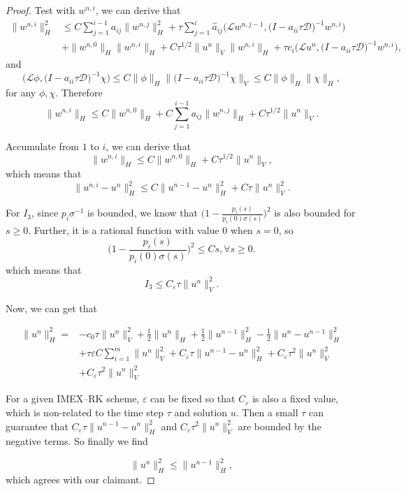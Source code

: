 \documentclass[a4paper, oneside]{book}
\def\epsilon{\varepsilon}
\def\hata{{\hat{a}}}
\def\calD{{\mathcal{D}}}
\def\calL{{\mathcal{L}}}
\begin{document}
\begin{proof}
Test with $w^{n,i}$, we can derive that 
\begin{align*}\|w^{n,i}\|_H^2 &\leq C \sum\limits_{j=1}^{i-1}a_{ij}\|w^{n,j}\|_H^2 
+ \tau \sum\limits_{j=1}^i\hata_{ij}\big(\calL w^{n,j-1},\big(I-a_{ii}\tau \calD \big)^{-1} w^{n,i} \big)\\
&+ \|w^{n,0}\|_H\|w^{n,i}\|_H + C\tau^{1/2} \|u^n\|_V\|w^{n,i}\|_H+ \tau c_i\big(\calL u^n, \big(I-a_{ii}\tau \calD\big)^{-1}w^{n,i}\big),
\end{align*}
and
$$\big(\calL\phi,\big(I-a_{ii}\tau \calD\big)^{-1} \chi \big) 
\leq C\|\phi\|_H\|\big(I-a_{ii}\tau \calD\big)^{-1} \chi\|_V
\leq C\|\phi\|_H\|\chi\|_H,$$
for any $\phi, \chi$. 
Therefore
$$\|w^{n,i}\|_H \leq C \|w^{n,0}\|_H + C \sum\limits_{j=1}^{i-1}a_{ij}\|w^{n,j}\|_H+C \tau^{1/2}\|u^n\|_V.$$

Accumulate from $1$ to $i$, we can derive that
$$\|w^{n,i}\|_H \leq C \|w^{n,0}\|_H + C \tau^{1/2}\|u^n\|_V,$$
which means that
$$\|u^{n,i}-u^n\|_H^2 \leq C \|u^{n-1}-u^n\|_H^2 + C \tau\|u^n\|_V^2.$$

For $I_3$, since $p_i\sigma^{-1}$ is bounded, we know that $\Big(1 -\frac{p_i(s)}{p_i(0)\sigma(s)}\Big)^2$
is also bounded for $s\geq 0$. Further, it is a rational function with value $0$ when $s = 0$, so
$$\bigg(1 -\frac{p_i(s)}{p_i(0)\sigma(s)}\bigg)^2 \leq Cs, \forall s \geq 0.$$
which means that
$$I_3 \leq C_\epsilon\tau \big\|u^n\big\|_V^2.$$

Now, we can get that

\begin{align*}
    \big\|u^n\big\|_H^2 =& - c_0\tau\big\|u^n\big\|_V^2 + \frac12\big\|u^n\big\|_H+\frac12\big\|u^{n-1}\big\|_H^2-\frac12\big\|u^n-u^{n-1}\big\|_H^2\\
    &+ \tau \epsilon C \sum_{i=1}^m\big\|u^n\big\|_V^2 + C_\epsilon\tau \|u^{n-1}-u^n\|_H^2 + C_\epsilon \tau^2\|u^n\|_V^2 \\
    &+ C_\epsilon\tau^2 \big\|u^n\big\|_V^2
\end{align*}

For a given IMEX--RK scheme, $\epsilon$ can be fixed so that $C_\epsilon$ is also a fixed value,
which is non-related to the time step $\tau$ and solution $u$.
Then a small $\tau$ can guarantee that
$C_\epsilon\tau \|u^{n-1}-u^n\|_H^2$ and $C_\epsilon\tau^2 \big\|u^n\big\|_V^2$ are bounded by the negative terms.
So finally we find

$$\big\|u^n\big\|_H^2 \leq  \big\|u^{n-1}\big\|_H^2, $$
which agrees with our claimant.
\end{proof}
\end{document}
